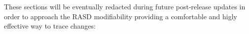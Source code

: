 These sections will be eventually redacted during future post-release updates in order to approach the RASD modifiability providing a comfortable and higly effective way to trace changes:

